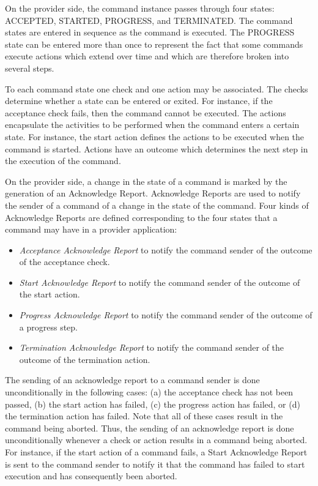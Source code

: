 On the provider side, the command instance passes through four states: ACCEPTED, STARTED, PROGRESS, and TERMINATED. The command states are entered in sequence as the command is executed. The PROGRESS state can be entered more than once to represent the fact that some commands execute actions which extend over time and which are therefore broken into several steps.

To each command state one check and one action may be associated. The checks determine whether a state can be entered or exited. For instance, if the acceptance check fails, then the command cannot be executed. The actions encapsulate the activities to be performed when the command enters a certain state. For instance, the start action defines the actions to be executed when the command is started. Actions have an outcome which determines the next step in the execution of the command.

On the provider side, a change in the state of a command is marked by the generation of an Acknowledge Report. Acknowledge Reports are used to notify the sender of a command of a change in the state of the command. Four kinds of Acknowledge Reports are defined corresponding to the four states that a command may have in a provider application:

\begin{itemize}
\item \textit{Acceptance Acknowledge Report} to notify the command sender of the outcome of the acceptance check.
\item \textit{Start Acknowledge Report} to notify the command sender of the outcome of the start action.
\item \textit{Progress Acknowledge Report} to notify the command sender of the outcome of a progress step.
\item \textit{Termination Acknowledge Report} to notify the command sender of the outcome of the termination action.
\end{itemize}

The sending of an acknowledge report to a command sender is done unconditionally in the following cases: (a) the acceptance check has not been passed, (b) the start action has failed, (c) the progress action has failed, or (d) the termination action has failed. Note that all of these cases result in the command being aborted. Thus, the sending of an acknowledge report is done unconditionally whenever a check or action results in a command being aborted. For instance, if the start action of a command fails, a Start Acknowledge Report is sent to the command sender to notify it that the command has failed to start execution and has consequently been aborted.


